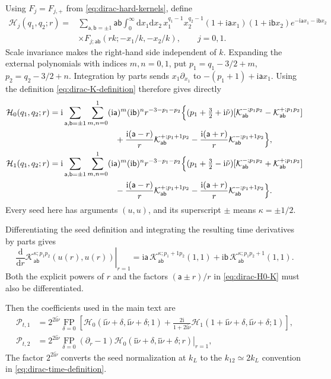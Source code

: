 \documentclass[a4paper,12pt]{article}
\def\di{{\mathrm{d}}}
\def\ii{\mathrm{i}}
\def\tn{\tilde\nu}
\def\aa{\mathsf{a}}
\def\bb{\mathsf{b}}
\begin{document}
Using $F_j=F_{j,+}$ from \eqref{eq:dirac-hard-kernels}, define
\begin{align}
 \mathcal H_j(q_1,q_2;r)
 ={}&\sum_{\aa,\bb=\pm1}\aa\bb
 \int_0^\infty\di x_1\di x_2\,
 x_1^{q_1-1}x_2^{q_2-1}
 (1+\ii\aa x_1)(1+\ii\bb x_2)e^{-\ii\aa x_1-\ii\bb x_2}
 \nonumber\\
 &\times F_{j;\aa\bb}(rk;-x_1/k,-x_2/k),\qquad j=0,1.
 \label{eq:dirac-H-definition}
\end{align}
Scale invariance makes the right-hand side independent of $k$.
Expanding the external polynomials with indices $m,n=0,1$, put $p_1=q_1-3/2+m$, $p_2=q_2-3/2+n$.
Integration by parts sends $x_1\partial_{x_1}$ to $-(p_1+1)+\ii\aa x_1$.
Using the definition \eqref{eq:dirac-K-definition} therefore gives directly
\begin{align}
 \mathcal H_0(q_1,q_2;r)
 ={}&\ii
 \sum_{\aa,\bb=\pm1}\sum_{m,n=0}^1
 (\ii\aa)^m(\ii\bb)^n r^{-3-p_1-p_2}
 \Big\{(p_1+\tfrac32+\ii\tn)
 [\mathcal K_{\aa\bb}^{-;p_1p_2}-\mathcal K_{\aa\bb}^{+;p_1p_2}]
 \nonumber\\
 &\hspace{23mm}
 +\frac{\ii(\aa-r)}r\mathcal K_{\aa\bb}^{+;p_1+1p_2}
 -\frac{\ii(\aa+r)}r\mathcal K_{\aa\bb}^{-;p_1+1p_2}\Big\},
 \label{eq:dirac-H0-K}\\
 \mathcal H_1(q_1,q_2;r)
 ={}&\ii
 \sum_{\aa,\bb=\pm1}\sum_{m,n=0}^1
 (\ii\aa)^m(\ii\bb)^n r^{-3-p_1-p_2}
 \Big\{(p_1+\tfrac32-\ii\tn)
 [\mathcal K_{\aa\bb}^{-;p_1p_2}+\mathcal K_{\aa\bb}^{+;p_1p_2}]
 \nonumber\\
 &\hspace{23mm}
 -\frac{\ii(\aa-r)}r\mathcal K_{\aa\bb}^{+;p_1+1p_2}
 -\frac{\ii(\aa+r)}r\mathcal K_{\aa\bb}^{-;p_1+1p_2}\Big\}.
 \label{eq:dirac-H1-K}
\end{align}
Every seed here has arguments $(u,u)$, and its superscript $\pm$ means $\kappa=\pm1/2$.

Differentiating the seed definition and integrating the resulting time derivatives by parts gives
\begin{equation}
 \left.\frac{\di}{\di r}
 \mathcal K_{\aa\bb}^{\kappa;p_1p_2}(u(r),u(r))\right|_{r=1}
 =\ii\aa\,\mathcal K_{\aa\bb}^{\kappa;p_1+1p_2}(1,1)
 +\ii\bb\,\mathcal K_{\aa\bb}^{\kappa;p_1p_2+1}(1,1).
 \label{eq:dirac-K-derivative}
\end{equation}
Both the explicit powers of $r$ and the factors $(\aa\pm r)/r$ in \eqref{eq:dirac-H0-K} must also be differentiated.

Then the coefficients used in the main text are
\begin{align}
 \mathcal P_{t,1}
 &=2^{2\ii\tn}\underset{\delta=0}{\operatorname{FP}}\left[
 \mathcal H_0(\ii\tn+\delta,\ii\tn+\delta;1)
 +\frac{2\ii}{1+2\ii\tn}
 \mathcal H_1(1+\ii\tn+\delta,\ii\tn+\delta;1)\right],
 \nonumber\\
 \mathcal P_{t,2}
 &=2^{2\ii\tn}\underset{\delta=0}{\operatorname{FP}}
 \left.(\partial_r-1)
 \mathcal H_0(\ii\tn+\delta,\ii\tn+\delta;r)\right|_{r=1},
 \label{eq:dirac-P-from-seed}
\end{align}
The factor $2^{2\ii\tn}$ converts the seed normalization at $k_L$ to the $k_{12}\simeq2k_L$ convention in \eqref{eq:dirac-time-definition}.
\end{document}

